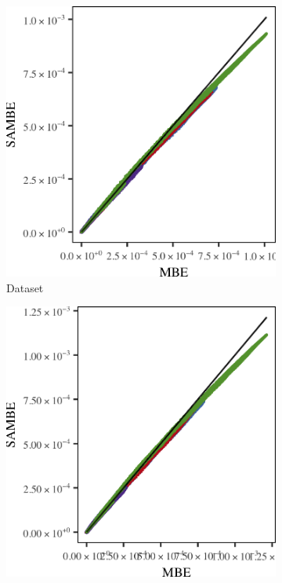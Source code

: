 	\begin{figure}
		\centering
		\begin{subfigure}{0.23\textwidth}
			\centering
			\includegraphics[keepaspectratio=true, width=\textwidth, height=0.23\textheight]{discussion/img/ferdosi_3_120000_mbe_sambe.png}
			\caption{Dataset \ferdosiThree}
			\label{fig:discussion:multisphere:mbevssambe:ferdosi3}
		\end{subfigure}
		\begin{subfigure}{0.23\textwidth}
			\centering
			\includegraphics[keepaspectratio=true, width=\textwidth, height=0.23\textheight]{discussion/img/baakman_3_120000_mbe_sambe.png}

\end{subfigure}
\end{figure}
